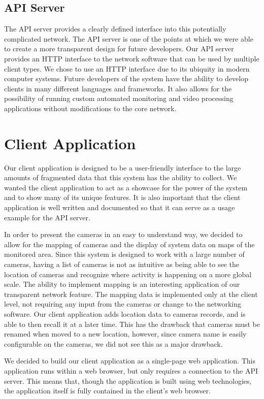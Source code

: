 \subsection{API Server}

The API server provides a clearly defined interface into this potentially
complicated network. The API server is one of the points at which we were able
to create a more transparent design for future developers. Our API server
provides an HTTP interface to the network software that can be used by multiple
client types. We chose to use an HTTP interface due to its ubiquity in modern
computer systems. Future developers of the system have the ability to develop
clients in many different languages and frameworks. It also allows for the
possibility of running custom automated monitoring and video processing
applications without modifications to the core network.

\section{Client Application}

Our client application is designed to be a user-friendly interface to the large
amounts of fragmented data that this system has the ability to collect. We
wanted the client application to act as a showcase for the power of the system
and to show many of its unique features. It is also important that the client
application is well written and documented so that it can serve as a usage
example for the API server.

In order to present the cameras in an easy to understand way, we decided to
allow for the mapping of cameras and the display of system data on maps of the
monitored area. Since this system is designed to work with a large number of
cameras, having a list of cameras is not as intuitive as being able to see the
location of cameras and recognize where activity is happening on a more global
scale. The ability to implement mapping is an interesting application of our
transparent network feature. The mapping data is implemented only at the client
level, not requiring any input from the cameras or change to the networking
software. Our client application adds location data to cameras records, and is
able to then recall it at a later time.  This has the drawback that cameras must
be renamed when moved to a new location, however, since camera name is easily
configurable on the cameras, we did not see this as a major drawback.

We decided to build our client application as a single-page web application.
This application runs within a web browser, but only requires a connection to
the API server. This means that, though the application is built using web
technologies, the application itself is fully contained in the client's web
browser.

